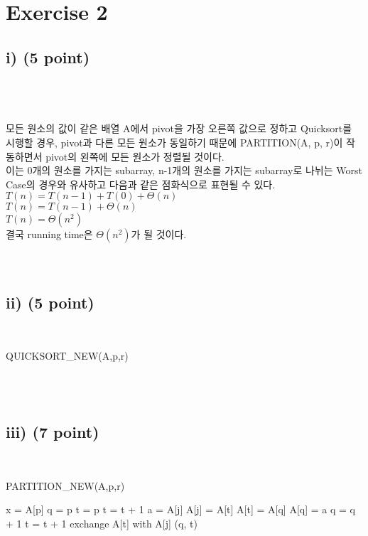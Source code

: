 \documentclass{article}
\author{관우 안}
\begin{document}
\section{Exercise 2}


\subsection{i) (5 point)}
\\
\\
\\
모든 원소의 값이 같은 배열 A에서 pivot을 가장 오른쪽 값으로 정하고 Quicksort를 시행할 경우, pivot과 다른 모든 원소가 동일하기 때문에 PARTITION(A, p, r)이 작동하면서 pivot의 왼쪽에 모든 원소가 정렬될 것이다.\\
이는 0개의 원소를 가지는 subarray, n-1개의 원소를 가지는 subarray로 나뉘는 Worst Case의 경우와 유사하고 다음과 같은 점화식으로 표현될 수 있다.\\
$T(n) = T(n-1) + T(0) + \Theta(n)$\\
$T(n) = T(n-1) + \Theta(n)$\\
$T(n) = \Theta(n^2)$\\
결국 running time은 $\Theta(n^2)$가 될 것이다.\\
\\
\\
\subsection{ii) (5 point)}
\\
\begin{algorithmic}
 \STATE QUICKSORT\_NEW(A,p,r)
\end{algorithmic}
  
\begin{algorithmic}
\end{algorithmic}
\\
\\
\subsection{iii) (7 point)}
\\
\begin{algorithmic}
 \STATE PARTITION\_NEW(A,p,r)
\end{algorithmic}
  
\begin{algorithmic}
 \STATE x = A[p]
 \STATE q = p
 \STATE t = p
 \STATE t = t + 1
 \STATE a = A[j]
 \STATE A[j] = A[t]
 \STATE A[t] = A[q]
 \STATE A[q] = a
 \STATE q = q + 1
 \STATE t = t + 1
 \STATE exchange A[t] with A[j]
 \ENDFOR
 \RETURN (q, t)

\end{algorithmic}
\end{document}
